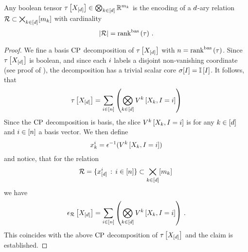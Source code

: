 \begin{theorem}
    Any boolean tensor $ \tau\left[X_{[d]}\right]\in\bigotimes_{k\in[d]} \mathbb{R}^{m_{k}}$ is the encoding of a $d$-ary relation $\mathcal{R}\subset\bigtimes_{k\in[d]}[m_{k}]$ with cardinality
    \begin{align*}
        \left|\mathcal{R}\right| = \mathrm{rank}^{\mathrm{bas}}\left(\tau\right) \, .
    \end{align*}
\end{theorem}
\begin{proof}
    We fine a basis $\mathrm{CP}$ decomposition of $\tau\left[X_{[d]}\right]$ with $n=\mathrm{rank}^{\mathrm{bas}}\left(\tau\right)$.
    Since $\tau\left[X_{[d]}\right]$ is boolean, and since each $i$ labels a disjoint non-vanishing coordinate (see proof of ), the decomposition has a trivial scalar core $\sigma[I]=\mathbb{I}\left[I\right]$.
    It follows, that
    \begin{align*}
        \tau\left[X_{[d]}\right] = \sum_{i\in[n]} \left(\bigotimes_{k\in[d]}V^{k}\left[X_{k},I=i\right]\right)
    \end{align*}
    Since the $\mathrm{CP}$ decomposition is basis, the slice $V^{k}\left[X_{k},I=i\right]$ is for any $k\in[d]$ and $i\in[n]$ a basis vector.
    We then define
    \begin{align*}
        x_{k}^{i} = \epsilon^{-1}(V^{k}\left[X_{k},I=i\right])
    \end{align*}
    and notice, that for the relation
    \begin{align*}
        \mathcal{R} = \{ x_{[d]}^{i}  \, : \, i\in[n]\} \subset \bigtimes_{k\in[d]}[m_{k}] \,
    \end{align*}
    we have
    \begin{align*}
        \epsilon_{\mathcal{R}}\left[X_{[d]}\right] = \sum_{i\in[n]} \left(\bigotimes_{k\in[d]}V^{k}\left[X_{k},I=i\right]\right) \, .
    \end{align*}
    This coincides with the above $\mathrm{CP}$ decomposition of $\tau\left[X_{[d]}\right]$ and the claim is established.
\end{proof}



